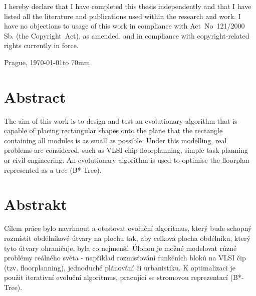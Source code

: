 \documentclass[11pt,twoside,a4paper]{book}
\begin{document}
I hereby declare that I have completed this thesis independently and that I have listed all the literature and publications used within the research and work. I have no objections to usage of this work in compliance with Act~No~121/2000 Sb. (the Copyright~Act), as amended, and in compliance with copyright-related rights currently in force.

\bigskip
\bigskip

\noindent
Prague, \today \hfill \hbox to 70mm{\tiny\dotfill}


\cleardoublepage
\vspace*{\fill}

\section*{Abstract}

The aim of this work is to design and test an evolutionary algorithm that is capable of placing rectangular shapes onto the plane that the rectangle containing all modules is as small as possible. Under this modelling, real problems are considered, such as VLSI chip floorplanning, simple task planning or civil engineering. An evolutionary algorithm is used to optimise the floorplan represented as a tree (B*-Tree).

\section*{Abstrakt}

Cílem práce bylo navrhnout a otestovat evoluční algoritmus, který bude schopný rozmístit obdélníkové útvary na plochu tak, aby celková plocha obdélníku, který tyto útvary ohraničuje, byla co nejmenší. Úlohou je možné modelovat různé problémy reálného světa - například rozmisťování funkčních bloků na VLSI čip (tzv. floorplanning), jednoduché plánování či urbanistiku. K optimalizaci je použit iterativní evoluční algoritmus, pracující se stromovou reprezentací (B*-Tree).


\tableofcontents


\cleardoublepage
\setcounter{page}{1}
\pagestyle{headings}










\listoffigures
\listoftables

\end{document}
